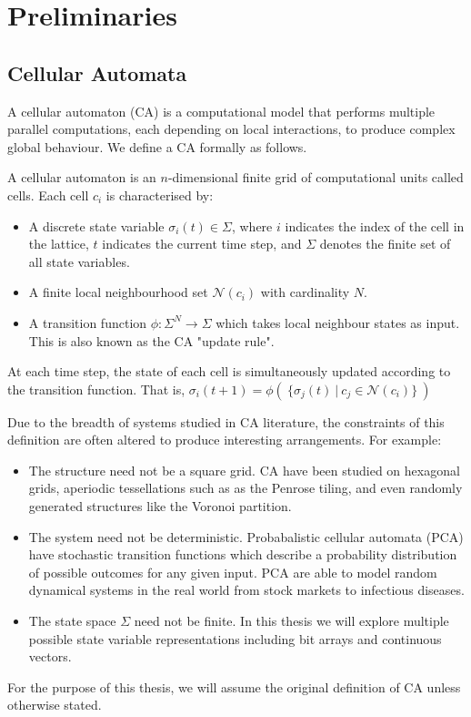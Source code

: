 \chapter{Preliminaries} \label{preliminaries}

\section{Cellular Automata}

A cellular automaton (CA) is a computational model that performs multiple parallel computations, each depending on local interactions, to produce complex global behaviour. We define a CA formally as follows.

\begin{definition}
A cellular automaton is an $n$-dimensional finite grid of computational units called cells. Each cell $c_i$ is characterised by:
\begin{itemize}
  \item A discrete state variable $\sigma_i(t) \in \Sigma$, where $i$ indicates the index of the cell in the lattice, $t$ indicates the current time step, and $\Sigma$ denotes the finite set of all state variables.
  \item A finite local neighbourhood set $\mathcal{N}(c_i)$ with cardinality $N$.
  \item A transition function $\phi:\Sigma^N \to \Sigma$ which takes local neighbour states as input. This is also known as the CA "update rule".
\end{itemize}

At each time step, the state of each cell is simultaneously updated according to the transition function. That is, $\sigma_i(t+1) = \phi( \:\{ \sigma_j(t) \: | \: c_j \in \mathcal{N}(c_i) \} \:)$
\end{definition}

Due to the breadth of systems studied in CA literature, the constraints of this definition are often altered to produce interesting arrangements. For example:
\begin{itemize}
  \item The structure need not be a square grid. CA have been studied on hexagonal grids\cite{encinas2007modelling}, aperiodic tessellations such as as the Penrose tiling\cite{goucher2012gliders}, and even randomly generated structures like the Voronoi partition\cite{shi2000development}.
  \item The system need not be deterministic. Probabalistic cellular automata (PCA) have stochastic transition functions which describe a probability distribution of possible outcomes for any given input. PCA are able to model random dynamical systems in the real world from stock markets\cite{bartolozzi2004stochastic} to infectious diseases\cite{mikler2005modeling}.
  \item The state space $\Sigma$ need not be finite. In this thesis we will explore multiple possible state variable representations including bit arrays and continuous vectors.
\end{itemize}
For the purpose of this thesis, we will assume the original definition of CA unless otherwise stated.


